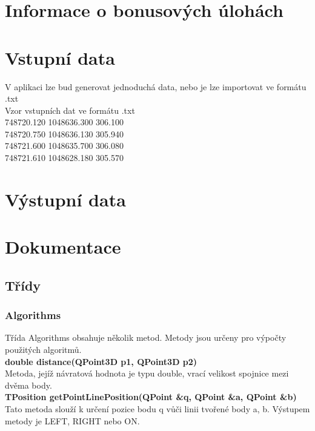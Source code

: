 \documentclass[a4paper, 12pt]{article}
\begin{document}
\section{Informace o bonusových úlohách}


\section{Vstupní data}
V aplikaci lze bud generovat jednoduchá data, nebo je lze importovat ve formátu .txt\\

Vzor vstupních dat ve formátu .txt\\
 748720.120    1048636.300     306.100\\
 748720.750    1048636.130     305.940\\
 748721.600    1048635.700     306.080\\
 748721.610    1048628.180     305.570\\

\section{Výstupní data}



\clearpage

\section{Dokumentace}
\subsection{Třídy}
\subsubsection{Algorithms}
Třída Algorithms obsahuje několik metod. Metody jsou určeny pro výpočty použitých algoritmů.
\\

\textbf{double distance(QPoint3D p1, QPoint3D p2)}\\
Metoda, jejíž návratová hodnota je typu double, vrací velikost spojnice mezi dvěma body.
\\

\textbf{TPosition getPointLinePosition(QPoint \&q, QPoint \&a, QPoint \&b)}\\
Tato metoda slouží k určení pozice bodu q vůči linii tvořené body a, b. Výstupem metody je LEFT, RIGHT nebo ON.\\
\end{document}

